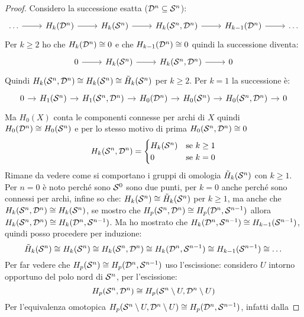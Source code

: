 \begin{proof}
  Considero la successione esatta ($ \mathcal{D}^{n} \subseteq \mathcal{S}^{n} $):
  \[
    \begin{tikzcd}
      \dots \rar & H_k(\Disk{n}) \rar & H_k(\Sph{n}) \rar & H_k(\Sph{n}, \Disk{n}) \rar & H_{k-1}(\Disk{n}) \rar & \dots
    \end{tikzcd}
  \]
  Per $ k \geq 2 $ ho che $ H_k(\mathcal{D}^{n}) \cong 0 $ e che $ H_{k-1}(\mathcal{D}^{n}) \cong 0 $ quindi
  la successione diventa:
  \[
    \begin{tikzcd}
      0 \rar & H_k(\Sph{n}) \rar & H_k(\Sph{n}, \Disk{n}) \rar & 0
    \end{tikzcd}
  \]
  Quindi $ H_k(\mathcal{S}^{n}, \mathcal{D}^{n}) \cong H_k(\mathcal{S}^{n}) \cong \tilde{H}_k(\mathcal{S}^{n}) $ per $ k \geq 2 $.
  Per $ k = 1 $ la successione è:
  \[
    \begin{tikzcd}[nodes={column sep=10pt}]
      0 \rar & H_1(\Sph{n}) \rar & H_1(\Sph{n}, \Disk{n}) \rar & H_0(\Disk{n}) \rar & H_0(\Sph{n}) \rar & H_0(\Sph{n}, \Disk{n}) \rar & 0
    \end{tikzcd}
  \]
  Ma $ H_0(X) $ conta le componenti connesse per archi di $ X $ quindi $ H_0(\mathcal{D}^{n}) \cong H_0(\mathcal{S}^{n}) $
  e per lo stesso motivo di prima $ H_0(\mathcal{S}^{n}, \mathcal{D}^{n}) \cong 0$
  \[
    H_k(\mathcal{S}^{n}, \mathcal{D}^{n}) =
    \begin{cases}
      H_k(\mathcal{S}^{n}) & \text{se } k \geq 1 \\
      0 & \text{se } k = 0
    \end{cases}
  \]
  Rimane da vedere come si comportano i gruppi di omologia
  $ \tilde{H}_k(\mathcal{S}^{n}) $ con $ k \geq 1 $. Per $ n = 0 $ è noto perché sono
  $ \mathcal{S}^{0} $ sono due punti, per $ k = 0 $ anche perché sono connessi per
  archi, infine so che: $ H_k(\mathcal{S}^{n}) \cong \tilde{H}_k(\mathcal{S}^{n}) $ per
  $ k \geq 1 $, ma anche che $ H_k(\mathcal{S}^{n}, \mathcal{D}^{n}) \cong H_k(\mathcal{S}^{n}) $, se mostro
  che $ H_p(\mathcal{S}^{n}, \mathcal{D}^{n}) \cong H_p(\mathcal{D}^{n}, \mathcal{S}^{n-1}) $ allora
  $ H_k(\mathcal{S}^{n}, \mathcal{D}^{n}) \cong H_k(\mathcal{D}^{n}, \mathcal{S}^{n-1}) $. Ma ho mostrato che
  $ H_k(\mathcal{D}^{n}, \mathcal{S}^{n-1}) \cong H_{k-1}(\mathcal{S}^{n-1}) $, quindi posso procedere per
  induzione:
  \[
    \tilde{H}_k(\mathcal{S}^{n}) \cong H_k(\mathcal{S}^{n}) \cong H_k(\mathcal{S}^{n}, \mathcal{D}^{n}) \cong H_k(\mathcal{D}^{n}, \mathcal{S}^{n-1}) \cong H_{k-1}(\mathcal{S}^{n-1}) \cong \dots
  \]
  Per far vedere che $ H_p(\mathcal{S}^{n}) \cong H_p(\mathcal{D}^{n}, \mathcal{S}^{n-1}) $ uso l'escissione:
  considero $ U $ intorno opportuno del polo nord di $ \mathcal{S}^{n} $, per l'escissione:
  \[
    H_p(\mathcal{S}^{n}, \mathcal{D}^{n}) \cong H_p(\mathcal{S}^{n} \setminus U, \mathcal{D}^{n} \setminus U )
  \]
  Per l'equivalenza omotopica
  $ H_p(\mathcal{S}^{n} \setminus U, \mathcal{D}^{n} \setminus U ) \cong H_p(\mathcal{D}^{n}, \mathcal{S}^{n-1}) $, infatti dalla

\end{proof}
